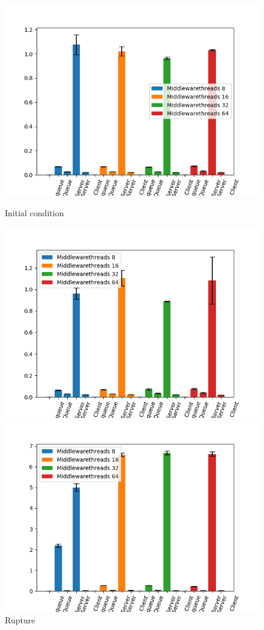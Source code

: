 \documentclass[11pt,a4paper]{article}
\begin{document}
\begin{figure}[H] 
  \label{ fig7} 
  \begin{minipage}[b]{0.5\linewidth}
    \centering
    \includegraphics[width=0.7\linewidth]{img/exp3_2/exp3_2_mw_percentile_plots_writes_0__vc_1.png} 
    \caption{Initial condition} 
    \vspace{4ex}
  \end{minipage}%
  \begin{minipage}[b]{0.5\linewidth}
    \centering
    \includegraphics[width=0.7\linewidth]{img/exp3_2/exp3_2_mw_percentile_plots_writes_1__vc_1.png} 
    \caption{Rupture} 
    \vspace{4ex}
  \end{minipage} 
  \begin{minipage}[b]{0.5\linewidth}
    \centering
    \includegraphics[width=0.7\linewidth]{img/exp3_2/exp3_2_mw_percentile_plots_writes_0__vc_4.png} 

\end{minipage}
\end{figure}
\end{document}
